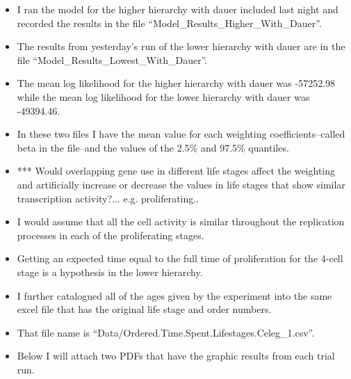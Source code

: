 \documentclass[letterpaper,index=totoc,hyperref,openany]{labbook} %
\begin{document}
\begin{itemize}
\item I ran the model for the higher hierarchy with dauer included last night and recorded the results in the file \enquote{Model\_Results\_Higher\_With\_Dauer}.
\item The results from yesterday's run of the lower hierarchy with dauer are in the file \enquote{Model\_Results\_Lowest\_With\_Dauer}.
\item The mean log likelihood for the higher hierarchy with dauer was -57252.98 while the mean log likelihood for the lower hierarchy with dauer was -49394.46.
\item In these two files I have the mean value for each weighting coefficients--called beta in the file--and the values of the 2.5\% and 97.5\% quantiles.
\item *** Would overlapping gene use in different life stages affect the weighting and artificially increase or decrease the values in life stages that show similar transcription activity?... e.g. proliferating.. 
\item I would assume that all the cell activity is similar throughout the replication processes in each of the proliferating stages. 
\item Getting an expected time equal to the full time of proliferation for the 4-cell stage is a hypothesis in the lower hierarchy.
\item I further catalogued all of the ages given by the experiment into the same excel file that has the original life stage and order numbers.
\item That file name is \enquote{Data/Ordered.Time.Spent.Lifestages.Celeg\_1.csv}.
\item Below I will attach two PDFs that have the graphic results from each trial run.
\end{itemize}
\end{document}

